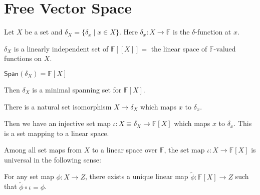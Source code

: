 \documentclass[
	11pt, %
	fleqn, %
	a4paper, %
]{LegrandOrangeBook}
\renewcommand{\span}[1]{\mathsf{Span}(#1)} %
\newcommand{\F}{\mathbb{F}} %
\begin{document}
\begin{center}
\end{center}

\newpage

\section{Free Vector Space}

Let $X$ be a set and $\delta_X = \{ \delta_x \mid x \in X \}$. Here $\delta_x : X \to \F$ is the $\delta$-function at $x$. 

\begin{proposition}
    $\delta_X$ is a linearly independent set of $\F[[X]] =$ the linear space of $\F$-valued functions on $X$.
\end{proposition}

\begin{proposition}
    $\span{\delta_X} = \F[X]$
\end{proposition}

Then $\delta_X$ is a minimal spanning set for $\F[X]$.

\begin{proposition}
    There is a natural set isomorphism $X \to \delta_X$ which maps $x$ to $\delta_x$.
\end{proposition}

Then we have an injective set map $\iota : X \equiv \delta_X \to \F[X]$ which maps $x$ to $\delta_x$. This is a set mapping to a linear space.

Among all set maps from $X$ to a linear space over $\F$, the set map $\iota : X \to \F[X]$ is universal in the following sense:
\begin{center}
\end{center}
For any set map $\phi : X \to Z$, there exists a unique linear map $\tilde{\phi} : \F[X] \to Z$ such that $\tilde{\phi} \circ \iota = \phi$.
\end{document}
